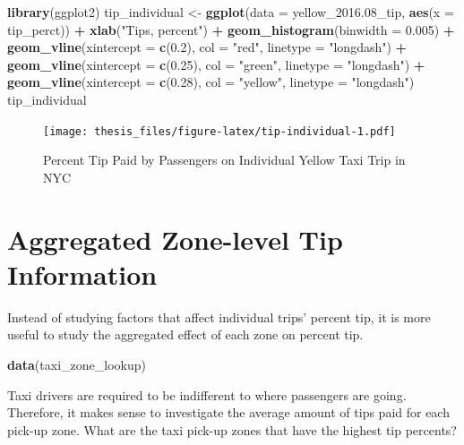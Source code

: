 \documentclass[12pt,twoside]{reedthesis}
\newenvironment{Shaded}{\begin{snugshade}}{\end{snugshade}}
\newcommand{\KeywordTok}[1]{\textcolor[rgb]{0.13,0.29,0.53}{\textbf{#1}}}
\newcommand{\DataTypeTok}[1]{\textcolor[rgb]{0.13,0.29,0.53}{#1}}
\newcommand{\FloatTok}[1]{\textcolor[rgb]{0.00,0.00,0.81}{#1}}
\newcommand{\StringTok}[1]{\textcolor[rgb]{0.31,0.60,0.02}{#1}}
\newcommand{\OperatorTok}[1]{\textcolor[rgb]{0.81,0.36,0.00}{\textbf{#1}}}
\newcommand{\NormalTok}[1]{#1}
\theoremstyle{definition}
\theoremstyle{definition}
\theoremstyle{definition}
\theoremstyle{remark}
\begin{document}
\begin{Shaded}
\begin{Highlighting}[]
\KeywordTok{library}\NormalTok{(ggplot2)}
\NormalTok{tip_individual <-}\StringTok{ }\KeywordTok{ggplot}\NormalTok{(}\DataTypeTok{data =}\NormalTok{ yellow_}\FloatTok{2016.}\NormalTok{08_tip, }
    \KeywordTok{aes}\NormalTok{(}\DataTypeTok{x =}\NormalTok{ tip_perct)) }\OperatorTok{+}\StringTok{ }\KeywordTok{xlab}\NormalTok{(}\StringTok{"Tips, percent"}\NormalTok{) }\OperatorTok{+}\StringTok{ }\KeywordTok{geom_histogram}\NormalTok{(}\DataTypeTok{binwidth =} \FloatTok{0.005}\NormalTok{) }\OperatorTok{+}\StringTok{ }
\StringTok{    }\KeywordTok{geom_vline}\NormalTok{(}\DataTypeTok{xintercept =} \KeywordTok{c}\NormalTok{(}\FloatTok{0.2}\NormalTok{), }\DataTypeTok{col =} \StringTok{"red"}\NormalTok{, }\DataTypeTok{linetype =} \StringTok{"longdash"}\NormalTok{) }\OperatorTok{+}\StringTok{ }
\StringTok{    }\KeywordTok{geom_vline}\NormalTok{(}\DataTypeTok{xintercept =} \KeywordTok{c}\NormalTok{(}\FloatTok{0.25}\NormalTok{), }\DataTypeTok{col =} \StringTok{"green"}\NormalTok{, }
        \DataTypeTok{linetype =} \StringTok{"longdash"}\NormalTok{) }\OperatorTok{+}\StringTok{ }\KeywordTok{geom_vline}\NormalTok{(}\DataTypeTok{xintercept =} \KeywordTok{c}\NormalTok{(}\FloatTok{0.28}\NormalTok{), }
    \DataTypeTok{col =} \StringTok{"yellow"}\NormalTok{, }\DataTypeTok{linetype =} \StringTok{"longdash"}\NormalTok{)}
\NormalTok{tip_individual}
\end{Highlighting}
\end{Shaded}
\begin{figure}
\centering
\texttt{[image: thesis\_files/figure-latex/tip-individual-1.pdf]}
\caption{\label{fig:tip-individual}Percent Tip Paid by Passengers on
Individual Yellow Taxi Trip in NYC}
\end{figure}
\section{Aggregated Zone-level Tip
Information}\label{aggregated-zone-level-tip-information}

Instead of studying factors that affect individual trips' percent tip,
it is more useful to study the aggregated effect of each zone on percent
tip.
\begin{Shaded}
\begin{Highlighting}[]
\KeywordTok{data}\NormalTok{(taxi_zone_lookup)}
\end{Highlighting}
\end{Shaded}
Taxi drivers are required to be indifferent to where passengers are
going. Therefore, it makes sense to investigate the average amount of
tips paid for each pick-up zone. What are the taxi pick-up zones that
have the highest tip percents?
\end{document}
